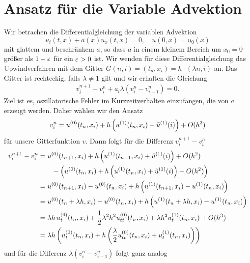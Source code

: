 \section{Ansatz für die Variable Advektion}
\label{section:varadv}

Wir betrachen die Differentialgleichung der variablen Advektion
\[ 
u_t(t,x) + a(x) u_x(t,x) = 0, \quad u(0,x) = u_0(x)
\]
mit glattem und beschränkem $a$, so dass $a$ in einem kleinem Bereich um $x_0=0$ größer als $1+\varepsilon$ für ein $\varepsilon > 0$ ist.
Wir wenden für diese Differentialgleichung das Upwindverfahren mit dem Gitter $G(n,i) = (t_n, x_i) = h \cdot (\lambda n,i)$ an.
Das Gitter ist rechteckig, falls $\lambda \neq 1$ gilt und wir erhalten die Gleichung
\begin{align}\label{eq:varadv:verfahren}
v^{n+1}_i - v^n_i + a_i \lambda \left( v^n_i - v^n_{i-1} \right) = 0.
\end{align}
Ziel ist es, oszillatorische Fehler im Kurzzeitverhalten einzufangen, die von $a$ erzeugt werden.
Daher wählen wir den Ansatz
\begin{align}\label{eq:varadv:ansatz}
v^n_i = u^{(0)}(t_n, x_i) + h \left( u^{(1)}(t_n, x_i) + \tilde u^{(1)}(i) \right) + O(h^2)
\end{align}
für unsere Gitterfunktion $v$. 
Dann folgt für die Differenz $v^{n+1}_i - v^n_i$
\begin{align*}
v^{n+1}_i - v^n_i
&= u^{(0)}(t_{n+1}, x_i) + h \left( u^{(1)}(t_{n+1}, x_i) + \tilde u^{(1)}(i) \right) + O(h^2)\\
   &\qquad - \left( u^{(0)}(t_n, x_i) + h \left( u^{(1)}(t_n, x_i) + \tilde u^{(1)}(i)\right)  + O(h^2)\right)\\
&= u^{(0)}(t_{n+1}, x_i) - u^{(0)}(t_n, x_i) + h \left( u^{(1)}(t_{n+1}, x_i) - u^{(1)}(t_n, x_i)\right)\\
&= u^{(0)}(t_n + \lambda h, x_i) - u^{(0)}(t_n, x_i) + h \left( u^{(1)}(t_n + \lambda h, x_i) - u^{(1)}(t_n, x_i)\right)\\
&= \lambda h \, u^{(0)}_t (t_n, x_i) + \frac 12 \lambda^2 h^2 u^{(0)}_{tt}(t_n, x_i) + \lambda h^2 u^{(1)}_t(t_n, x_i) + O(h^3)\\
&= \lambda h \left( u^{(0)}_t (t_n, x_i) + h \left( \frac \lambda 2 u^{(0)}_{tt}(t_n, x_i) + u^{(1)}_t(t_n, x_i) \right) \right)
\end{align*}
und für die Differenz $\lambda (v^n_{i} - v^n_{i-1})$ folgt ganz analog
